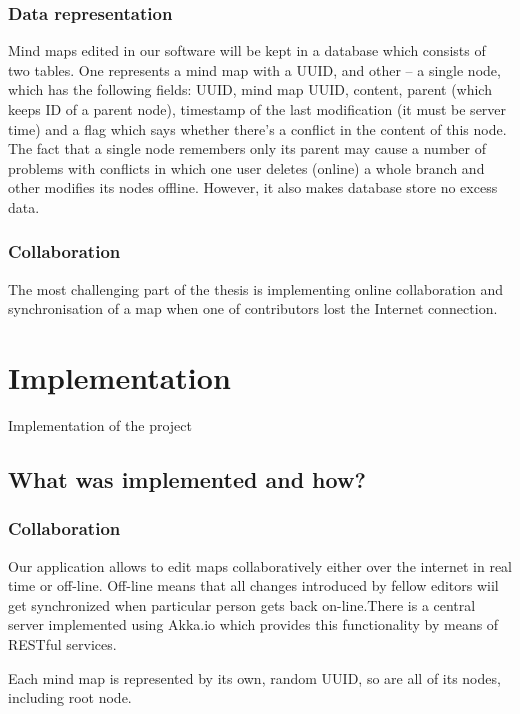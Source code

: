 \documentclass[american]{bsc}
\begin{document}
\subsection{Data representation}
\label{sec:plan:dat}
Mind maps edited in our software will be kept  in a database which consists of two tables. One represents a mind map with a UUID, and other -- a single node, which has the following fields: UUID, mind map UUID, content, parent (which keeps ID of a parent node), timestamp of the last modification (it must be server time) and a flag which says whether there's a conflict in the content of this node. The fact that a single node remembers only its parent may  cause a number of problems with conflicts in which one user deletes (online) a whole branch and other modifies its nodes offline. However, it also makes database store no excess data. 

\subsection{Collaboration}
\label{sec:plan:coll}
The most challenging part of the thesis is implementing online collaboration and synchronisation of a map when one of contributors lost the Internet connection.  

\chapter{Implementation}
\label{chap:implementation}

Implementation of the project

\section{What was implemented and how?}
\label{implwhat}

\subsection{Collaboration}
\label{impl-collaboration}
Our application allows to edit maps collaboratively either over the internet in real time or off-line. Off-line means that all changes introduced by fellow editors wiil get synchronized when particular person gets back on-line.There is a central server implemented using Akka.io which provides this functionality by means of RESTful services. 

Each mind map is represented by its own,  random UUID, so are all of its nodes, including root node.  
\end{document}
